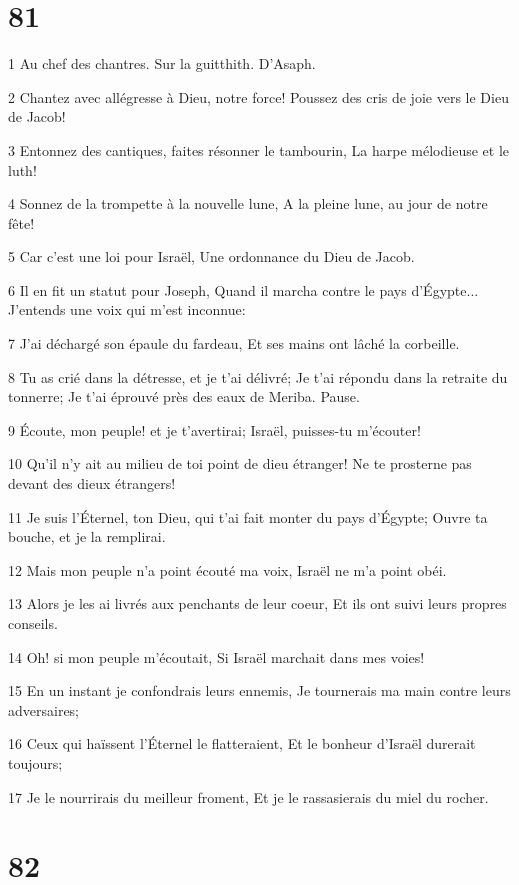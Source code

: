 \chapter{81}

\par 1 Au chef des chantres. Sur la guitthith. D'Asaph.
\par 2 Chantez avec allégresse à Dieu, notre force! Poussez des cris de joie vers le Dieu de Jacob!
\par 3 Entonnez des cantiques, faites résonner le tambourin, La harpe mélodieuse et le luth!
\par 4 Sonnez de la trompette à la nouvelle lune, A la pleine lune, au jour de notre fête!
\par 5 Car c'est une loi pour Israël, Une ordonnance du Dieu de Jacob.
\par 6 Il en fit un statut pour Joseph, Quand il marcha contre le pays d'Égypte... J'entends une voix qui m'est inconnue:
\par 7 J'ai déchargé son épaule du fardeau, Et ses mains ont lâché la corbeille.
\par 8 Tu as crié dans la détresse, et je t'ai délivré; Je t'ai répondu dans la retraite du tonnerre; Je t'ai éprouvé près des eaux de Meriba. Pause.
\par 9 Écoute, mon peuple! et je t'avertirai; Israël, puisses-tu m'écouter!
\par 10 Qu'il n'y ait au milieu de toi point de dieu étranger! Ne te prosterne pas devant des dieux étrangers!
\par 11 Je suis l'Éternel, ton Dieu, qui t'ai fait monter du pays d'Égypte; Ouvre ta bouche, et je la remplirai.
\par 12 Mais mon peuple n'a point écouté ma voix, Israël ne m'a point obéi.
\par 13 Alors je les ai livrés aux penchants de leur coeur, Et ils ont suivi leurs propres conseils.
\par 14 Oh! si mon peuple m'écoutait, Si Israël marchait dans mes voies!
\par 15 En un instant je confondrais leurs ennemis, Je tournerais ma main contre leurs adversaires;
\par 16 Ceux qui haïssent l'Éternel le flatteraient, Et le bonheur d'Israël durerait toujours;
\par 17 Je le nourrirais du meilleur froment, Et je le rassasierais du miel du rocher.

\chapter{82}

